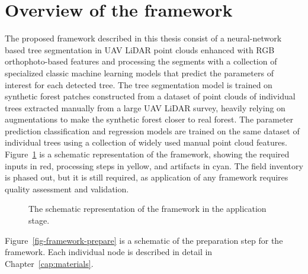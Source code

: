 \section{Overview of the framework}

The proposed framework described in this thesis consist of a neural-network based tree segmentation in UAV LiDAR point clouds enhanced with RGB orthophoto-based features and processing the segments with a collection of specialized classic machine learning models that predict the parameters of interest for each detected tree.
The tree segmentation model is trained on synthetic forest patches constructed from a dataset of point clouds of individual trees extracted manually from a large UAV LiDAR survey, heavily relying on augmentations to make the synthetic forest closer to real forest.
The parameter prediction classification and regression models are trained on the same dataset of individual trees using a collection of widely used manual point cloud features.
Figure~\ref{fig-framework-apply} is a schematic representation of the framework, showing the required inputs in red, processing steps in yellow, and artifacts in cyan.
The field inventory is phased out, but it is still required, as application of any framework requires quality assessment and validation.

\begin{figure}
\caption[Schematic representation of the framework: application]{\label{fig-framework-apply}The schematic representation of the
framework in the application stage.}
\end{figure}

Figure~\ref{fig-framework-prepare} is a schematic of the preparation step for the framework.
Each individual node is described in detail in Chapter~\ref{cap:materials}.


